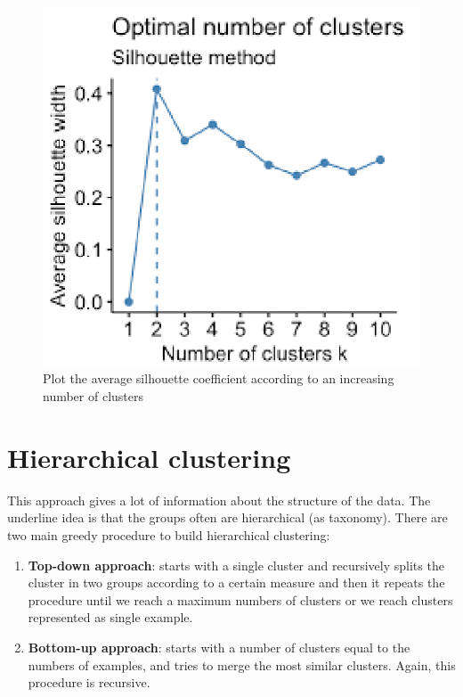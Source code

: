 \begin{itemize}
\begin{figure}[ht]
                    \includegraphics[scale=0.3]{images/silhouettemethod.png}
                    \caption{Plot the average silhouette coefficient according to an increasing number of clusters}
                    \label{fig:silhouette}
                \end{figure}
            \end{itemize}

    \section{Hierarchical clustering}
        This approach gives a lot of information about the structure of the data. The underline idea is that the groups often are hierarchical (as taxonomy). 
        There are two main greedy procedure to build hierarchical clustering: 
        \begin{enumerate}
            \item \textbf{Top-down approach}: starts with a single cluster and recursively splits the cluster in two groups according to a certain measure and then it repeats the procedure until we reach a maximum numbers of clusters or we reach clusters represented as single example.
            \item \textbf{Bottom-up approach}: starts with a number of clusters equal to the numbers of examples, and tries to merge the most similar clusters. Again, this procedure is recursive.
        \end{enumerate}


